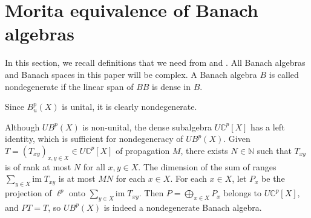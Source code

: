 \documentclass[a4,11pt]{amsart}
\newtheorem{lem}[thm]{Lemma}
\theoremstyle{remark}
\begin{document}
\section{Morita equivalence of Banach algebras} \label{sect:Mor}

In this section, we recall definitions that we need from \cite{Laf02} and \cite{Par09}.
All Banach algebras and Banach spaces in this paper will be complex.
A Banach algebra $B$ is called nondegenerate if the linear span of $BB$ is dense in $B$.

Since $B^p_u(X)$ is unital, it is clearly nondegenerate.
%
%
%

Although $UB^p(X)$ is non-unital, the dense subalgebra $U\mathbb{C}^p[X]$ has a left identity, which is sufficient for nondegeneracy of $UB^p(X)$.
Given $T=(T_{xy})_{x,y\in X}\in U\mathbb{C}^p[X]$ of propagation $M$, there exists $N\in\mathbb{N}$ such that $T_{xy}$ is of rank at most $N$ for all $x,y\in X$.
The dimension of the sum of ranges $\sum_{y\in X}\mathrm{im}\;T_{xy}$ is at most $MN$ for each $x\in X$.
For each $x\in X$, let $P_x$ be the projection of $\ell^p$ onto $\sum_{y\in X}\mathrm{im}\;T_{xy}$.
Then $P=\bigoplus_{x\in X}P_x$ belongs to $U\mathbb{C}^p[X]$, and $PT=T$, so $UB^p(X)$ is indeed a nondegenerate Banach algebra.
\end{document}

